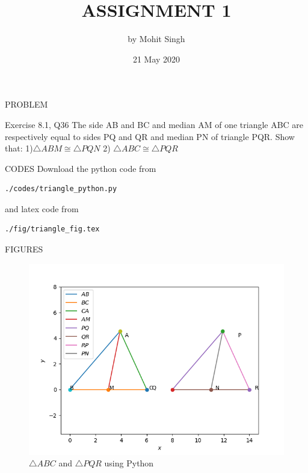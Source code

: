 \documentclass[11pt]{beamer}
\title{ASSIGNMENT 1}
\author{by Mohit Singh}
\institute{IIEST, Shibpur}
\date{21 May 2020}
\begin{document}
\maketitle
\begin{frame}{PROBLEM}
\begin{block}{Exercise 8.1, Q36}
The side AB and BC and median AM of one triangle ABC are respectively equal to sides PQ and QR and median PN of triangle PQR. Show that:
\newline
\newline
{1)$\triangle  ABM  \cong   \triangle  PQN $}
\newline
{2) $\triangle  ABC  \cong   \triangle  PQR $}
\end{block}

\end{frame}

\begin{frame}[containsverbatim]{CODES}
Download the python code from
\begin{lstlisting}
./codes/triangle_python.py
\end{lstlisting}
and latex code from
\begin{lstlisting}
./fig/triangle_fig.tex
\end{lstlisting}
\end{frame}

\begin{frame}{FIGURES}
\begin{figure}
\includegraphics[scale=0.5]{Figure_1.png}
\caption{$\triangle ABC$ and $\triangle PQR$ using Python}
\end{figure}
\end{frame}
\end{document}
